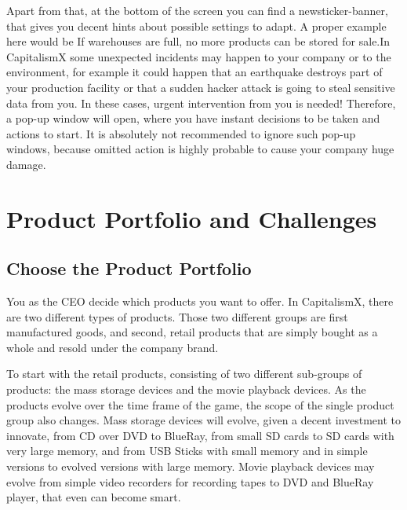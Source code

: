 \documentclass[11pt,titlepage,oneside,openany]{book}
\begin{document}
Apart from that, at the bottom of the screen you can find a newsticker-banner, that gives you decent hints about possible settings to adapt. A proper example here would be  If warehouses are full, no more products can be stored for sale.In CapitalismX some unexpected incidents may happen to your company or to the environment, for example it could happen that an earthquake destroys part of your production facility or that a sudden hacker attack is going to steal sensitive data from you. In these cases, urgent intervention from you is needed! Therefore, a pop-up window will open, where you have instant decisions to be taken and actions to start. It is absolutely not recommended to ignore such pop-up windows, because omitted action is highly probable to cause your company huge damage.


 
%







\section{Product Portfolio and Challenges}

\subsection{Choose the Product Portfolio}
\label{sub:portfolio}

You as the CEO decide which products you want to offer. In CapitalismX, there are two different types of products. Those two different groups are first manufactured goods, and second, retail products that are simply bought as a whole and resold under the company brand.

To start with the retail products, consisting of two different sub-groups of products: the mass storage devices and the movie playback devices. As the products evolve over the time frame of the game, the scope of the single product group also changes. Mass storage devices will evolve, given a decent investment to innovate, from CD over DVD to BlueRay, from small SD cards to SD cards with very large memory, and from USB Sticks with small memory and in simple versions to evolved versions with large memory. Movie playback devices may evolve from simple video recorders for recording tapes to DVD and BlueRay player, that even can become smart. 
\end{document}
